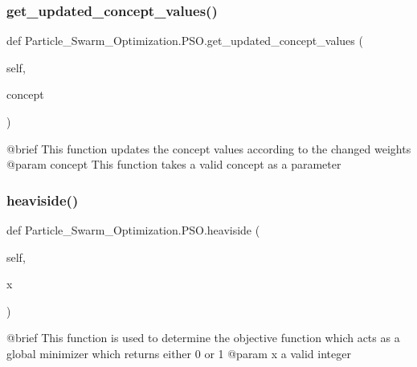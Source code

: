 \subsubsection{\texorpdfstring{get\+\_\+updated\+\_\+concept\+\_\+values()}{get\_updated\_concept\_values()}}
{\footnotesize\ttfamily def Particle\+\_\+\+Swarm\+\_\+\+Optimization.\+P\+S\+O.\+get\+\_\+updated\+\_\+concept\+\_\+values (\begin{DoxyParamCaption}\item[{}]{self,  }\item[{}]{concept }\end{DoxyParamCaption})}

\begin{DoxyVerb}@brief This function updates the concept values according to the changed weights
@param concept This function takes a valid concept as a parameter
\end{DoxyVerb}
 \hypertarget{class_particle___swarm___optimization_1_1_p_s_o_a923072a9af1fea8affadfd0bd1a947cf}{}\label{class_particle___swarm___optimization_1_1_p_s_o_a923072a9af1fea8affadfd0bd1a947cf} 
\subsubsection{\texorpdfstring{heaviside()}{heaviside()}}
{\footnotesize\ttfamily def Particle\+\_\+\+Swarm\+\_\+\+Optimization.\+P\+S\+O.\+heaviside (\begin{DoxyParamCaption}\item[{}]{self,  }\item[{}]{x }\end{DoxyParamCaption})}

\begin{DoxyVerb}@brief  This function is used to determine the objective function which acts as a global minimizer which returns either 0 or 1
@param  x  a valid integer
\end{DoxyVerb}
 \hypertarget{class_particle___swarm___optimization_1_1_p_s_o_a810301f0aeba3b2e31dd5c5203b8b201}{}\label{class_particle___swarm___optimization_1_1_p_s_o_a810301f0aeba3b2e31dd5c5203b8b201} 
